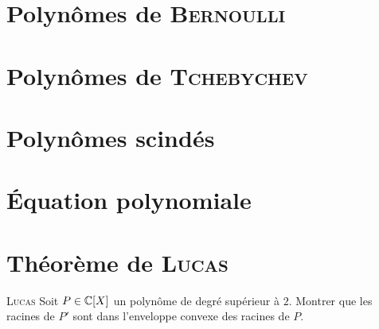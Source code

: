 \section{Polynômes de \textsc{Bernoulli}} 


\section{Polynômes de \textsc{Tchebychev}} 


\section{Polynômes scindés} 


\section{Équation polynomiale} 


\section{Théorème de \textsc{Lucas}}
\begin{theo}{\textsc{Lucas}}
    Soit $P \in \mathbb{C}[X]$ un polynôme de degré supérieur à $2$. Montrer que les racines de $P'$ sont dans l'enveloppe convexe des racines de $P$.
\end{theo}